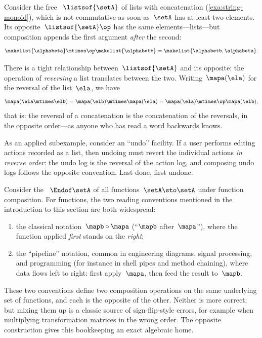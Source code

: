 \begin{example}
    \label{exa:opposite-lists}
    Consider the free ~$\listsof{\setA}$ of lists with concatenation (\cref{exa:string-monoid}), which is not commutative as soon as~$\setA$ has at least two elements.
    Its opposite~$\listsof{\setA}\op$ has the same elements---lists---but composition appends the first argument \emph{after} the second:
    \begin{equation}
        \makelist{\alphabeta} \mtimes\op \makelist{\alphabetb} = \makelist{\alphabetb, \alphabeta}.
    \end{equation}

    There is a tight relationship between~$\listsof{\setA}$ and its opposite: the operation of \emph{reversing} a list translates between the two.
    Writing~$\mapa(\ela)$ for the reversal of the list~$\ela$, we have
    \begin{equation}
        \mapa(\ela \mtimes \elb) = \mapa(\elb) \mtimes \mapa(\ela) = \mapa(\ela) \mtimes\op \mapa(\elb),
    \end{equation}
    that is: the reversal of a concatenation is the concatenation of the reversals, in the opposite order---as anyone who has read a word backwards knows.

    As an applied subexample, consider an ``undo'' facility.
    If a user performs editing actions recorded as a list, then undoing must revert the individual actions \emph{in reverse order}: the undo log is the reversal of the action log, and composing undo logs follows the opposite convention.
    Last done, first undone.
\end{example}

\begin{example}
    \label{exa:opposite-endofunctions}
    Consider the ~$\Endof\setA$ of all functions~$\setA \sto \setA$ under function composition.
    For functions, the two reading conventions mentioned in the introduction to this section are both widespread:
    \begin{enumerate}
        \item the classical notation~$\mapb \circ \mapa$ (``$\mapb$ after~$\mapa$''), where the function applied \emph{first} stands on the \emph{right};
        \item the ``pipeline'' notation, common in engineering diagrams, signal processing, and programming (for instance in shell pipes and method chaining), where data flows left to right: first apply~$\mapa$, then feed the result to~$\mapb$.
    \end{enumerate}
    These two conventions define two composition operations on the same underlying set of functions, and each is the opposite of the other.
    Neither is more correct; but mixing them up is a classic source of sign-flip-style errors, for example when multiplying transformation matrices in the wrong order.
    The opposite construction gives this bookkeeping an exact algebraic home.
\end{example}


